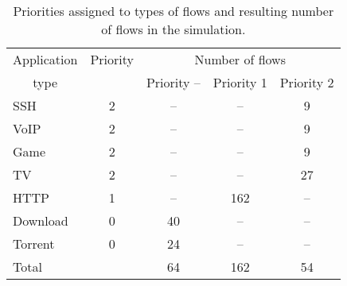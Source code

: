 \begin{table}
	\centering
	\begin{tabular}{@{}l|cccc@{}}
		\toprule
		\multicolumn{1}{c|}{Application} & Priority & \multicolumn{3}{c}{Number of flows}  \\
		\multicolumn{1}{c|}{type}        &          & Priority -- & Priority 1 & Priority 2 \\ \midrule
		SSH                              &    2     &     --      &     --      &     9      \\
		VoIP                             &    2     &     --      &     --      &     9      \\
		Game                             &    2     &     --      &     --      &     9      \\
		TV                               &    2     &     --      &     --      &     27     \\
		HTTP                             &    1     &     --      &    162     &     --      \\
		Download                         &    0     &     40     &     --      &     --      \\
		Torrent                          &    0     &     24     &     --      &     --      \\ \midrule
		Total                            &          &     64     &    162     &     54     \\ \bottomrule
	\end{tabular}

	\caption{Priorities assigned to types of flows and resulting number of flows in the simulation.}
	\label{tab:flows_count_A}
\end{table}
